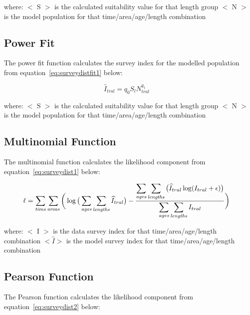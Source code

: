 \documentclass [a4paper, 10pt]{book}
\begin{document}
where:\newline
$<$ S $>$ is the calculated suitability value for that length group\newline
$<$ N $>$ is the model population for that time/area/age/length combination

\subsection{Power Fit}
The power fit function calculates the survey index for the modelled population from equation~\ref{eq:surveydistfit1} below:

\begin{equation}\label{eq:surveydistfit2}
\widehat{I}_{tral} = q_{0} S_{l} N_{tral} ^{q_{1}}
\end{equation}

where:\newline
$<$ S $>$ is the calculated suitability value for that length group\newline
$<$ N $>$ is the model population for that time/area/age/length combination

\subsection{Multinomial Function}
The multinomial function calculates the likelihood component from equation~\ref{eq:surveydist1} below:

\begin{equation}\label{eq:surveydist1}
\ell = \sum_{\it time}\sum_{\it areas} \bigg( \log \big(\sum_{\it ages}\sum_{\it lengths} \widehat{I}_{tral} \big) - {\frac { \displaystyle \sum_{\it ages}\sum_{\it lengths} \big(\widehat{I}_{tral} \log (I_{tral} + \epsilon) \big)} { \displaystyle \sum_{\it ages}\sum_{\it lengths} I_{tral}} } \bigg)
\end{equation}

where:\newline
$<$ I $>$ is the data survey index for that time/area/age/length combination\newline
$<\widehat{I}>$ is the model survey index for that time/area/age/length combination

\subsection{Pearson Function}
The Pearson function calculates the likelihood component from equation~\ref{eq:surveydist2} below:
\end{document}
